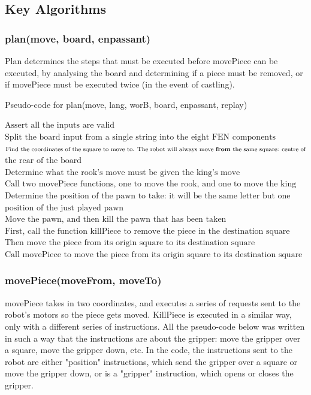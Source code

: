 \documentclass[onecolumn]{IEEEtran}
\begin{document}
\subsection{Key Algorithms}


\subsubsection{plan(move, board, enpassant)}
Plan determines the steps that must be executed before movePiece can be executed, by analysing the board and determining if a piece must be removed, or if movePiece must be executed twice (in the event of castling). 

\begin{algorithm}[H]
\caption{Pseudo-code for plan(move, lang, worB, board, enpassant, replay)}
\begin{algorithmic}[1]
\STATE $\text{Assert all the inputs are valid}$
\STATE $\text{Split the board input from a single string into the eight FEN components}$
\STATE $\text{Find the coordinates of the square to move to. The robot will always move \textbf{from} the same square: centre of}$
\STATEx $\text{the rear of the board}$
\STATE $\text{Determine what the rook's move must be given the king's move}$
\STATE $\text{Call two movePiece functions, one to move the rook, and one to move the king}$
\STATE $\text{Determine the position of the pawn to take: it will be the same letter but one number off the destination}$
\STATEx $\text{position of the just played pawn}$
\STATE $\text{Move the pawn, and then kill the pawn that has been taken}$
\STATE $\text{First, call the function killPiece to remove the piece in the destination square}$
\STATE $\text{Then move the piece from its origin square to its destination square}$
\ELSE
\STATE $\text{Call movePiece to move the piece from its origin square to its destination square}$
\ENDIF
\end{algorithmic}
\end{algorithm}

\subsubsection{movePiece(moveFrom, moveTo)}
movePiece takes in two coordinates, and executes a series of requests sent to the robot's motors so the piece gets moved. KillPiece is executed in a similar way, only with a different series of instructions. \newline
All the pseudo-code below was written in such a way that the instructions are about the gripper: move the gripper over a square, move the gripper down, etc. In the code, the instructions sent to the robot are either "position" instructions, which send the gripper over a square or move the gripper down, or is a "gripper" instruction, which opens or closes the gripper. 
\end{document}
